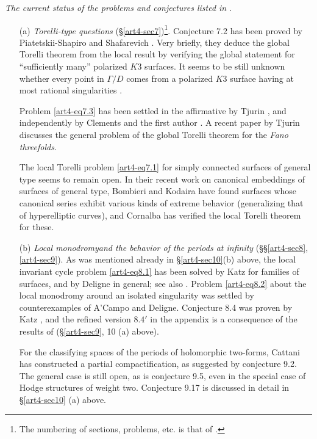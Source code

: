 \textit{The current status of the problems and conjectures listed in} \cite{art4-key21}.

\begin{itemize}
\item[(a)] \textit{Torelli-type questions} (\S \ref{art4-sec7})\footnote[45]{The numbering of sections, problems, etc. is that of \cite{art4-key21}.}. Conjecture 7.2 has been proved by Piatetskii-Shapiro and Shafarevich \cite{art4-key40}. Very briefly, they deduce the global Torelli theorem from the local result by verifying the global statement for ``sufficiently many'' polarized $K3$ surfaces. It seems to be still unknown whether every point in $\Gamma/ D$ comes from a polarized $K3$ surface having at most rational singularities \cite{art4-key37}.

Problem \eqref{art4-eq7.3} has been settled in the affirmative by Tjurin \cite{art4-key43}, and independently by Clements and the first author \cite{art4-key9}. A recent paper by Tjurin \cite{art4-key42} discusses the general problem of the global Torelli theorem for the \textit{Fano threefolds}.

The local Torelli problem \eqref{art4-eq7.1} for simply connected surfaces of general type seems to remain open. In their recent work on canonical embeddings of surfaces of general type, Bombieri and Kodaira \cite{art4-key3} have found surfaces whose canonical series exhibit various kinds of extreme behavior (generalizing that of hyperelliptic curves), and Cornalba has verified the local Torelli theorem for these.

\item[(b)] \textit{Local monodromy\pageoriginale and the behavior of the periods at infinity} (\S \S \ref{art4-sec8}, \ref{art4-sec9}). As was mentioned already in \S \ref{art4-sec10}(b) above, the local invariant cycle problem \eqref{art4-eq8.1} has been solved by Katz for families of surfaces, and by Deligne in general; see also \cite{art4-key10}. Problem \eqref{art4-eq8.2} about the local monodromy around an isolated singularity was settled by counterexamples of A'Campo and Deligne. Conjecture 8.4 was proven by Katz \cite{art4-key31}, and the refined version $8.4'$ in the appendix is a consequence of the results of \cite{art4-key41}
(\cf \S\ref{art4-sec9}, 10 (a) above).

For the classifying spaces of the periods of holomorphic two-forms, Cattani \cite{art4-key6} has constructed a partial compactification, as suggested by conjecture 9.2. The general case is still open, as is conjecture 9.5, even in the special case of Hodge structures of weight two. Conjecture 9.17 is discussed in detail in \S \ref{art4-sec10} (a) above.


\end{itemize}
